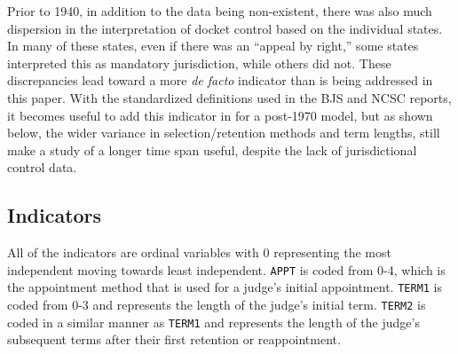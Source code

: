 \documentclass[12pt]{article}
\begin{document}
Prior to 1940, in addition to the data being non-existent, there was also much dispersion in the interpretation of docket control based on the individual states.  In many of these states, even if there was an ``appeal by right,'' some states interpreted this as mandatory jurisdiction, while others did not.  These discrepancies lead toward a more \textit{de facto} indicator than is being addressed in this paper.  With the standardized definitions used in the BJS and NCSC reports, it becomes useful to add this indicator in for a post-1970 model, but as shown below, the wider variance in selection/retention methods and term lengths, still make a study of a longer time span useful, despite the lack of jurisdictional control data.  

\subsection*{Indicators}
All of the indicators are ordinal variables with 0 representing the most independent moving towards least independent.  \texttt{APPT} is coded from 0-4, which is the appointment method that is used for a judge's initial appointment.  \texttt{TERM1} is coded from 0-3 and represents the length of the judge's initial term.  \texttt{TERM2} is coded in a similar manner as \texttt{TERM1} and represents the length of the judge's subsequent terms after their first retention or reappointment. 
\end{document}
